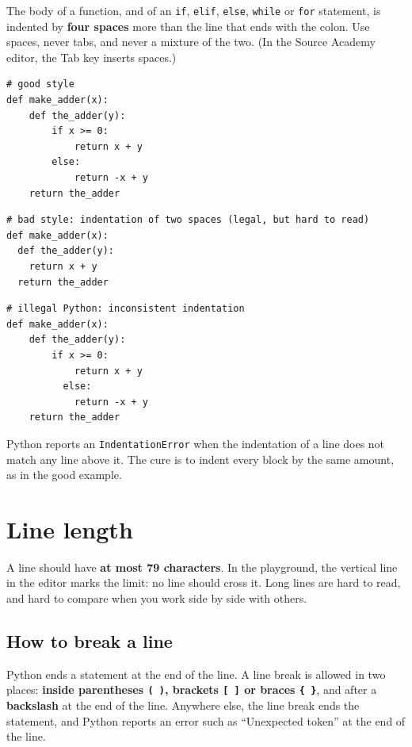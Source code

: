 The body of a function, and of an \lstinline{if}, \lstinline{elif}, \lstinline{else},
\lstinline{while} or \lstinline{for} statement, is indented by \textbf{four spaces} more
than the line that ends with the colon. Use spaces, never tabs, and never a mixture of the two.
(In the Source Academy editor, the Tab key inserts spaces.)

\begin{lstlisting}
# good style
def make_adder(x):
    def the_adder(y):
        if x >= 0:
            return x + y
        else:
            return -x + y
    return the_adder
\end{lstlisting}

\begin{lstlisting}
# bad style: indentation of two spaces (legal, but hard to read)
def make_adder(x):
  def the_adder(y):
    return x + y
  return the_adder
\end{lstlisting}

\begin{lstlisting}
# illegal Python: inconsistent indentation
def make_adder(x):
    def the_adder(y):
        if x >= 0:
            return x + y
          else:
            return -x + y
    return the_adder
\end{lstlisting}

Python reports an \lstinline{IndentationError} when the indentation of a line does not
match any line above it. The cure is to indent every block by the same amount, as in the good example.

\section*{Line length}

A line should have \textbf{at most 79 characters}. In the playground, the vertical line in the
editor marks the limit: no line should cross it. Long lines are hard to read, and hard to compare
when you work side by side with others.

\subsection*{How to break a line}

Python ends a statement at the end of the line. A line break is allowed in two places:
\textbf{inside parentheses \lstinline{( )}, brackets \lstinline{[ ]} or braces
\texttt{\{ \}}}, and after a \textbf{backslash} at the end of the line.
Anywhere else, the line break ends the statement, and Python reports an error such as
``Unexpected token'' at the end of the line.

